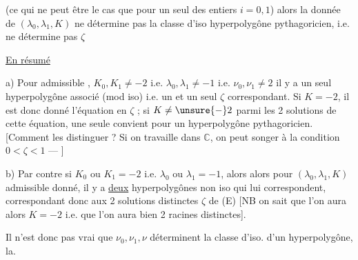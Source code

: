  (ce qui ne \unsure{;} peut être le cas que pour un seul des entiers $i=0,1$) alors la donnée de $(\lambda_0,\lambda_1,K)$ ne détermine pas la classe d'iso  hyperpolygône pythagoricien, i.e. ne détermine pas $\zeta$

\uline{En résumé}

a) Pour  admissible ,  $K_0,K_1\ne-2$ i.e. $\lambda_0,\lambda_1\ne-1$ i.e. $\nu_0,\nu_1\ne2$ il y a un  seul hyperpolygône associé (mod iso) i.e. un et un seul $\zeta$ correspondant. Si $K=-2$,  il est donc donné   l'équation en $\zeta$ ; si $K\ne\unsure{-}2$ parmi les 2 solutions de cette équation, une seule convient pour  un hyperpolygône pythagoricien. [Comment les distinguer ? Si on travaille dans $\mathbb C$, on peut songer à la condition $0<\zeta<1$ --- ]

b) Par contre si $K_0$ ou $K_1=-2$ i.e. $\lambda_0$ ou $\lambda_1=-1$,  alors alors pour $(\lambda_0,\lambda_1,K)$ admissible  donné, il y a \uline{deux} hyperpolygônes non iso qui lui correspondent, correspondant donc aux 2 solutions distinctes $\zeta$ de (E) [NB on sait  que l'on aura alors $K=-2$ i.e. que l'on aura bien 2 racines distinctes].

Il n'est donc pas vrai que $\nu_0,\nu_1,\nu$ déterminent la classe d'iso. d'un hyperpolygône,  la.
